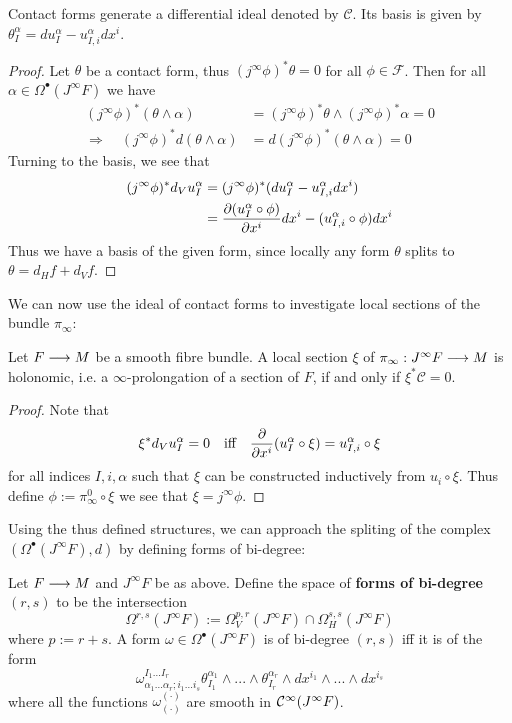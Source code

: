 \begin{theo}
  Contact forms generate a differential ideal denoted by $\mathcal{C}$. Its basis is given by $\theta^\alpha_I = du^\alpha_I - u^\alpha_{I,i} dx^i$.
\begin{proof}
  Let $\theta$ be a contact form, thus $(j^\infty \phi)^* \theta = 0$ for all $\phi \in \mathcal{F}$. Then for all $\alpha \in \Omega^\bullet(J^\infty F)$ we have
  \begin{align*}
    (j^\infty \phi)^* (\theta \wedge \alpha) &= (j^\infty \phi)^* \theta \wedge (j^\infty \phi)^* \alpha = 0\\
    \Rightarrow \quad (j^\infty \phi)^* d(\theta \wedge \alpha) &= d(j^\infty \phi)^* (\theta \wedge \alpha) = 0
  \end{align*}
  Turning to the basis, we see that
  \begin{align*}
    (j^\infty \phi)^* d_V u^\alpha_I &= (j^\infty \phi)^*(du^\alpha_I - u^\alpha_{I,i} dx^i)\\
    &= \dell{(u^\alpha_I \circ \phi)}{x^i} dx^i - (u^\alpha_{I,i} \circ \phi) dx^i
  \end{align*}
  Thus we have a basis of the given form, since locally any form $\theta$ splits to $\theta = d_H f + d_V f$.
\end{proof}
\end{theo}

We can now use the ideal of contact forms to investigate local sections of the bundle $\pi_\infty$:

\begin{lem}
  Let $F\longrightarrow M$ be a smooth fibre bundle. A local section $\xi$ of $\pi_\infty: J^\infty F \longrightarrow M$ is holonomic, i.e. a $\infty$-prolongation of a section of $F$, if and only if $\xi^* \mathcal{C} = 0$.
\begin{proof}
  Note that
  $$ \xi^* d_V u^\alpha_I = 0 \quad \text{iff} \quad \frac{\partial }{\partial x^i} (u^\alpha_I \circ \xi) = u^\alpha_{I,i} \circ \xi $$
  for all indices $I,i,\alpha$ such that $\xi$ can be constructed inductively from $u_i \circ \xi$. Thus define $\phi := \pi_\infty^0 \circ \xi$ we see that $\xi = j^\infty \phi$.
\end{proof}
\end{lem}

Using the thus defined structures, we can approach the spliting of the complex $(\Omega^\bullet(J^\infty F), d)$ by defining forms of bi-degree:

\begin{definition}
  Let $F \longrightarrow M$ and $J^\infty F$ be as above. Define the space of \textbf{forms of bi-degree $(r,s)$} to be the intersection
  $$ \Omega^{r,s}(J^\infty F) := \Omega_V^{p,r}(J^\infty F) \cap \Omega_H^{s,s}(J^\infty F) $$
  where $p:= r+s$. A form $\omega \in \Omega^\bullet(J^\infty F)$ is of bi-degree $(r,s)$ iff it is of the form
  $$ \omega^{I_1 ... I_r}_{\alpha_1 ... \alpha_r ; i_1 ... i_s} \theta^{\alpha_1}_{I_1} \wedge ... \wedge \theta^{\alpha_r}_{I_r} \wedge dx^{i_1} \wedge ... \wedge dx^{i_s}$$
  where all the functions $\omega^{(\cdot)}_{(\cdot)}$ are smooth in $\mathcal{C}^{\infty}(J^\infty F)$.
\end{definition}

